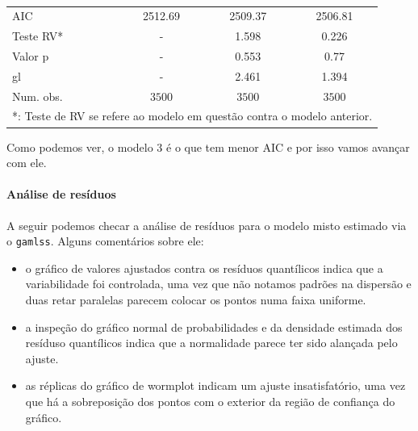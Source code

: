 \documentclass[
  11pt,
]{article}
\begin{document}
\begin{table}
\begin{center}
\begin{tabular}{l c c c}
AIC                & 2512.69     & 2509.37     & 2506.81     \\
Teste RV*          & -           & 1.598       & 0.226       \\
Valor p            & -           & 0.553       & 0.77        \\
gl                 & -           & 2.461       & 1.394       \\
Num. obs.          & $3500$      & $3500$      & $3500$      \\
\hline
\multicolumn{4}{l}{\scriptsize{*: Teste de RV se refere ao modelo em questão contra o modelo anterior.}}
\end{tabular}
\caption{}
\label{table:coefficients}
\end{center}
\end{table}

Como podemos ver, o modelo 3 é o que tem menor AIC e por isso vamos avançar com ele.

\hypertarget{anuxe1lise-de-resuxedduos}{%
\paragraph{Análise de resíduos}\label{anuxe1lise-de-resuxedduos}}

A seguir podemos checar a análise de resíduos para o modelo misto estimado via o \texttt{gamlss}. Alguns comentários sobre ele:

\begin{itemize}
\item
  o gráfico de valores ajustados contra os resíduos quantílicos indica que a variabilidade foi controlada, uma vez que não notamos padrões na dispersão e duas retar paralelas parecem colocar os pontos numa faixa uniforme.
\item
  a inspeção do gráfico normal de probabilidades e da densidade estimada dos resíduso quantílicos indica que a normalidade parece ter sido alançada pelo ajuste.
\item
  as réplicas do gráfico de wormplot indicam um ajuste insatisfatório, uma vez que há a sobreposição dos pontos com o exterior da região de confiança do gráfico.
\end{itemize}
\end{document}
